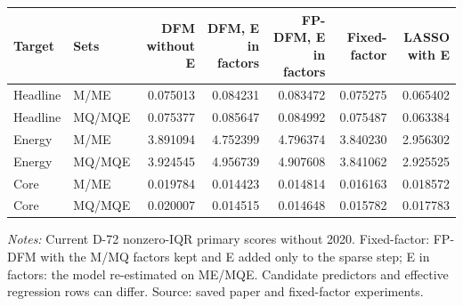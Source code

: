 \begin{threeparttable}
\begin{tabular}{llrrrrr}
\toprule
Target & Sets & DFM without E & DFM, E in factors & FP-DFM, E in factors & Fixed-factor & LASSO with E \\
\midrule
Headline & M/ME & 0.075013 & 0.084231 & 0.083472 & 0.075275 & 0.065402 \\
Headline & MQ/MQE & 0.075377 & 0.085647 & 0.084992 & 0.075487 & 0.063384 \\
Energy & M/ME & 3.891094 & 4.752399 & 4.796374 & 3.840230 & 2.956302 \\
Energy & MQ/MQE & 3.924545 & 4.956739 & 4.907608 & 3.841062 & 2.925525 \\
Core & M/ME & 0.019784 & 0.014423 & 0.014814 & 0.016163 & 0.018572 \\
Core & MQ/MQE & 0.020007 & 0.014515 & 0.014648 & 0.015782 & 0.017783 \\
\bottomrule
\end{tabular}
\begin{tablenotes}[flushleft]\footnotesize
\item \textit{Notes:} Current D-72 nonzero-IQR primary scores without 2020. Fixed-factor: FP-DFM with the M/MQ factors kept and E added only to the sparse step; E in factors: the model re-estimated on ME/MQE. Candidate predictors and effective regression rows can differ. Source: saved paper and fixed-factor experiments.
\end{tablenotes}
\end{threeparttable}
